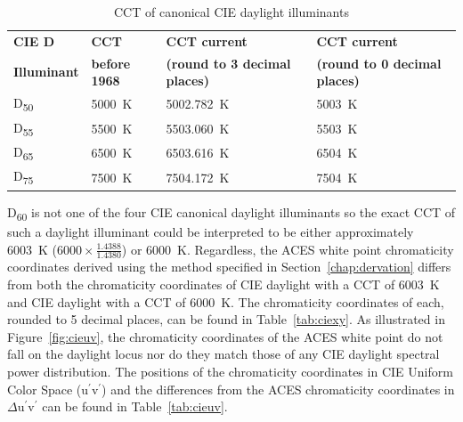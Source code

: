 \begin{table}[!ht]
    \centering
    \begin{tabularx}{.97\linewidth}{|Y|Y|Y|Y|}
    \hline
    \textbf{CIE D} & \textbf{CCT} & \textbf{CCT current} & \textbf{CCT current} \\ [-1.3ex]
    \textbf{Illuminant} & \textbf{before 1968} & \footnotesize{\textbf{(round to 3 decimal places)}} & \footnotesize{\textbf{(round to 0 decimal places)}} \\ \hline
    D\textsubscript{50} & \SI[mode=text]{5000}{\kelvin} & \SI[mode=text]{5002.782}{\kelvin} & \SI[mode=text]{5003}{\kelvin} \\ \hline
    D\textsubscript{55} & \SI[mode=text]{5500}{\kelvin} & \SI[mode=text]{5503.060}{\kelvin} & \SI[mode=text]{5503}{\kelvin} \\ \hline
    D\textsubscript{65} & \SI[mode=text]{6500}{\kelvin} & \SI[mode=text]{6503.616}{\kelvin} & \SI[mode=text]{6504}{\kelvin} \\ \hline
	D\textsubscript{75} & \SI[mode=text]{7500}{\kelvin} & \SI[mode=text]{7504.172}{\kelvin} & \SI[mode=text]{7504}{\kelvin} \\ \hline
    \end{tabularx}
    \captionsetup{width=.75\textwidth}
    \caption{CCT of canonical CIE daylight illuminants \cite{tableValsPython}}
    \label{tab:d_cct}
\end{table}

D\textsubscript{60} is not one of the four CIE canonical daylight illuminants so the exact CCT of such a daylight illuminant could be interpreted to be either approximately \SI[mode=text]{6003}{\kelvin} ($6000 \times \frac{1.4388}{1.4380}$) or \SI[mode=text]{6000}{\kelvin}.  Regardless, the ACES white point chromaticity coordinates derived using the method specified in Section~\ref{chap:dervation} differs from both the chromaticity coordinates of CIE daylight with a CCT of \SI[mode=text]{6003}{\kelvin} and CIE daylight with a CCT of \SI[mode=text]{6000}{\kelvin}.  The chromaticity coordinates of each, rounded to 5 decimal places, can be found in Table~\ref{tab:ciexy}.  As illustrated in Figure~\ref{fig:cieuv}, the chromaticity coordinates of the ACES white point do not fall on the daylight locus nor do they match those of any CIE daylight spectral power distribution.  The positions of the chromaticity coordinates in CIE Uniform Color Space (u$^\prime$v$^\prime$) and the differences from the ACES chromaticity coordinates in $\Delta$u$^\prime$v$^\prime$ can be found in Table~\ref{tab:cieuv}.

